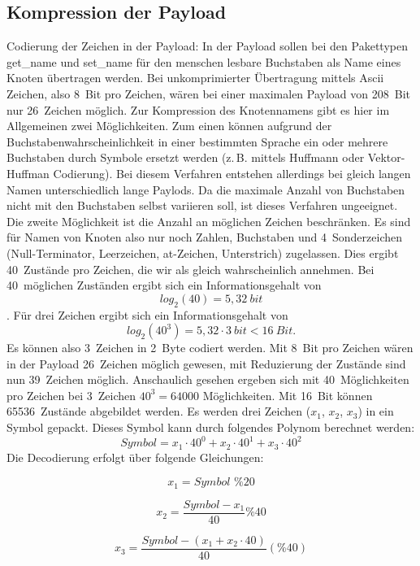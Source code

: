 \documentclass{IEEEtran}
\begin{document}
    \subsection{Kompression der Payload}
    Codierung der Zeichen in der Payload: 
    In der Payload sollen bei den Pakettypen get\_name und set\_name für den 
    menschen lesbare Buchstaben als Name eines Knoten übertragen werden. Bei 
    unkomprimierter Übertragung mittels Ascii Zeichen, also 8~Bit pro Zeichen, 
    wären bei einer maximalen Payload von 208~Bit nur 26~Zeichen möglich. Zur 
    Kompression des Knotennamens gibt es hier im Allgemeinen zwei Möglichkeiten. 
    Zum einen können aufgrund der Buchstabenwahrscheinlichkeit in einer 
    bestimmten Sprache ein oder mehrere Buchstaben durch Symbole ersetzt werden 
    (z.\,B. mittels Huffmann oder Vektor-Huffman Codierung). Bei diesem Verfahren 
    entstehen allerdings bei gleich langen Namen unterschiedlich lange Paylods. 
    Da die maximale Anzahl von Buchstaben nicht mit den Buchstaben selbst 
    variieren soll, ist dieses Verfahren ungeeignet. Die zweite Möglichkeit ist 
    die Anzahl an möglichen Zeichen beschränken. Es sind für Namen von Knoten 
    also nur noch Zahlen, Buchstaben und 4~Sonderzeichen (Null-Terminator, 
    Leerzeichen, at-Zeichen, Unterstrich) zugelassen. Dies ergibt 40~Zustände 
    pro Zeichen, die wir als gleich wahrscheinlich annehmen. Bei 40~möglichen 
    Zuständen ergibt sich ein Informationsgehalt von $$log_{2}(40) = 5,32~bit$$. 
    Für drei Zeichen ergibt sich ein Informationsgehalt von 
    $$log_{2}(40^3) = 5,32 \cdot 3~bit < 16~Bit.$$ Es können also 3~Zeichen 
    in 2~Byte codiert werden. Mit 8~Bit pro Zeichen wären in der Payload 
    26~Zeichen möglich gewesen, mit Reduzierung der Zustände sind nun 39~Zeichen 
    möglich.
    Anschaulich gesehen ergeben sich mit 40~Möglichkeiten pro Zeichen bei 
    3~Zeichen $40^3 = 64000$ Möglichkeiten. Mit 16~Bit können 65536~Zustände 
    abgebildet werden. 
    Es werden drei Zeichen ($x_{1}$, $x_{2}$, $x_{3}$) in ein Symbol gepackt. 
    Dieses Symbol kann durch folgendes Polynom berechnet werden:
    $$Symbol = x_{1} \cdot 40^{0} + x_{2} \cdot 40^{1} + x_{3} \cdot 40^{2}$$
    Die Decodierung erfolgt über folgende Gleichungen:

    $$x_{1}=Symbol \,\, \% 20$$

    $$x_{2} = \frac{Symbol - x_{1}}{40} \% 40$$
    
    $$x_{3} = \frac{Symbol - (x_{1} + x_{2} \cdot 40)}{40} (\% 40)$$
\end{document}

